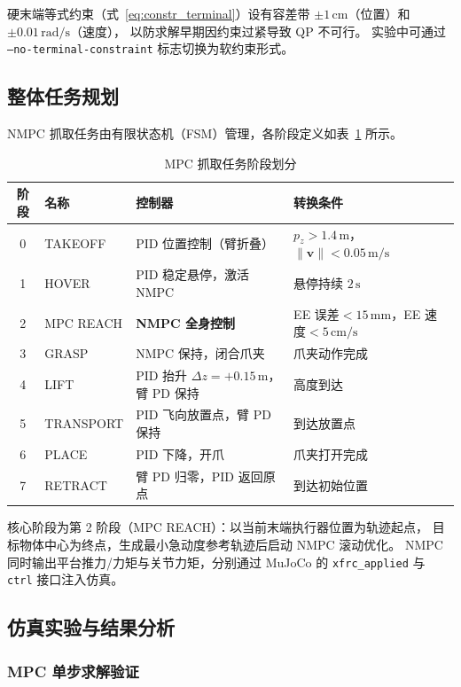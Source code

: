 硬末端等式约束（式~\eqref{eq:constr_terminal}）设有容差带
$\pm 1\,\mathrm{cm}$（位置）和 $\pm 0.01\,\mathrm{rad/s}$（速度），
以防求解早期因约束过紧导致 QP 不可行。
实验中可通过 \texttt{--no-terminal-constraint} 标志切换为软约束形式。

\subsection{整体任务规划}

NMPC 抓取任务由有限状态机（FSM）管理，各阶段定义如表~\ref{tab:mpc_phases} 所示。

\begin{table}[h]
\centering
\caption{MPC 抓取任务阶段划分}
\label{tab:mpc_phases}
\begin{tabular}{clll}
\hline
\textbf{阶段} & \textbf{名称} & \textbf{控制器} & \textbf{转换条件} \\
\hline
0 & TAKEOFF    & PID 位置控制（臂折叠）     & $p_z>1.4\,\mathrm{m}$，$\|\mathbf{v}\|<0.05\,\mathrm{m/s}$ \\
1 & HOVER      & PID 稳定悬停，激活 NMPC    & 悬停持续 $2\,\mathrm{s}$ \\
2 & MPC REACH  & \textbf{NMPC 全身控制}      & EE 误差$<15\,\mathrm{mm}$，EE 速度$<5\,\mathrm{cm/s}$ \\
3 & GRASP      & NMPC 保持，闭合爪夹         & 爪夹动作完成 \\
4 & LIFT       & PID 抬升 $\Delta z=+0.15\,\mathrm{m}$，臂 PD 保持 & 高度到达 \\
5 & TRANSPORT  & PID 飞向放置点，臂 PD 保持  & 到达放置点 \\
6 & PLACE      & PID 下降，开爪              & 爪夹打开完成 \\
7 & RETRACT    & 臂 PD 归零，PID 返回原点    & 到达初始位置 \\
\hline
\end{tabular}
\end{table}

核心阶段为第 2 阶段（MPC REACH）：以当前末端执行器位置为轨迹起点，
目标物体中心为终点，生成最小急动度参考轨迹后启动 NMPC 滚动优化。
NMPC 同时输出平台推力/力矩与关节力矩，分别通过 MuJoCo 的
\texttt{xfrc\_applied} 与 \texttt{ctrl} 接口注入仿真。

\subsection{仿真实验与结果分析}

\subsubsection{MPC 单步求解验证}


